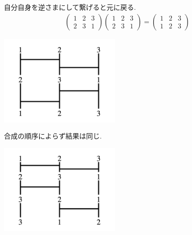 \documentclass[11pt, a4paper, dvipdfmx]{jsarticle}
\theoremstyle{definition}
\theoremstyle{mystyle}
\numberwithin{equation}{section} %
\begin{document}
自分自身を逆さまにして繋げると元に戻る. 
\begin{align*}
    \begin{pmatrix}
        1 & 2 & 3\\
        2 & 3 & 1
    \end{pmatrix}
    \begin{pmatrix}
        1 & 2 & 3\\
        2 & 3 & 1
    \end{pmatrix}
    = 
    \begin{pmatrix}
        1 & 2 & 3\\
        1 & 2 & 3
    \end{pmatrix}
\end{align*}
\begin{center}
    \includegraphics[width=6cm]{permutation/permutation5.png}
\end{center}

合成の順序によらず結果は同じ. 
\begin{center}
    \includegraphics[width=6cm]{permutation/permutation7.png}
\end{center}
\end{document}
